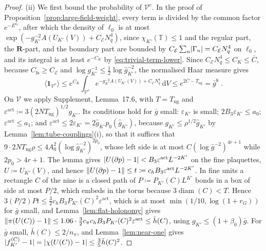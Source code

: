 \documentclass[11pt]{preprint}
\newcommand{\dd}{\mathrm{d}}
\newcommand{\diam}{\operatorname{diam}}
\DeclarePairedDelimiter{\abs}{\lvert}{\rvert}
\DeclarePairedDelimiter{\norm}{\lVert}{\rVert}
\numberwithin{equation}{section}
\theoremstyle{definition}
\theoremstyle{remark}
\theoremstyle{plain}
\begin{document}
\begin{proof}
(ii) We first bound the probability of $\mathcal V^c$. In the proof of Proposition~\ref{prop:large-field-weight}, every term is divided by the common factor $e^{-E^{\ell_0}}$, after which the density of $\ell_0$ is at most $\exp(-g_{K'}^{-2}A(U_{K'}(V)) + C_{\mathcal E}N_q^4)$, since $\chi_{K'}(\mathbb T) \leq 1$ and the regular part, the $\mathbf R$-part, and the boundary part are bounded by $C_{\mathcal E}\sum_n\abs{\Gamma_n} = C_{\mathcal E}N_q^4$ on $\ell_0$, and its integral is at least $e^{-C_K}$ by \eqref{eq:trivial-term-lower}. Since $C_{\mathcal E}N_q^4 \leq C_K \leq \bar C$, because $C_{\mathrm{fs}} \geq C_{\mathcal E}$ and $\log g_{K'}^{-1} \leq \frac12\log\hat g_{K'}^{-2}$, the normalised Haar measure gives
\begin{equation}\label{eq:typical-event}
    \langle\mathbf 1_{\mathcal V^c}\rangle \leq e^{C_K}\int_{\mathcal V^c}e^{-g_{K'}^{-2}A(U_{K'}(V)) + C_{\mathcal E}N_q^4}\,\dd V \leq e^{2\bar C - T_{\mathrm{ng}}} = \bar g^8\;.
\end{equation}
On $\mathcal V$ we apply Supplement, Lemma~17.6, with $T = T_{\mathrm{ng}}$ and $\varepsilon^{\mathrm{act}} \coloneqq 3(2NT_{\mathrm{ng}})^{1/2}g_{K'}$. Its conditions hold for $\bar g$ small: $\varepsilon_{K'}$ is small; $2B_3\varepsilon_{K'} \leq a_0$; $\varepsilon^{\mathrm{act}} \leq a_1$; and $\varepsilon^{\mathrm{act}} \leq 2\varepsilon_{K'} = 2\hat g_{K'}p_0(\hat g_{K'})$, because $g_{K'} \leq \rho^{1/2}\hat g_{K'}$ by Lemma~\ref{lem:tube-couplings}(i), so that it suffices that $9 \cdot 2NT_{\mathrm{ng}}\rho \leq 4A_0^2(\log\hat g_{K'}^{-2})^{2p_0}$, whose left side is at most $C(\log\bar g^{-2})^{4r+1}$ while $2p_0 > 4r + 1$. The lemma gives $\abs{U(\partial p) - 1} < B_3\varepsilon^{\mathrm{act}}L^{-2K'}$ on the fine plaquettes, $U \coloneqq U_{K'}(V)$, and hence $\norm{U(\partial p) - 1} \leq t \coloneqq c_hB_3\varepsilon^{\mathrm{act}}L^{-2K'}$. In fine units a rectangle $C$ of the nine is a closed path of $P \coloneqq P_{K'}(C)L^{K'}$ bonds in a box of side at most $P/2$, which embeds in the torus because $3\diam(C) < T$. Hence $3(P/2)Pt \leq \frac32c_hB_3P_{K'}(C)^2\varepsilon^{\mathrm{act}}$, which is at most $\min(1/10, \log(1 + r_G))$ for $\bar g$ small, and Lemma~\ref{lem:flat-holonomy} gives $\norm{\pi(U(C)) - 1} \leq 1.06 \cdot \frac32c_\pi c_hB_3P_{K'}(C)^2\varepsilon^{\mathrm{act}} \leq \bar h(C)$, using $g_{K'} \leq (1 + \beta_0)\bar g$. For $\bar g$ small, $\bar h(C) \leq 2/n_\pi$, and Lemma~\ref{lem:near-one} gives $\abs{f^{(C)}_{K'} - 1} = \abs{\chi(U(C)) - 1} \leq \frac35\bar h(C)^2$.


\end{proof}
\end{document}
